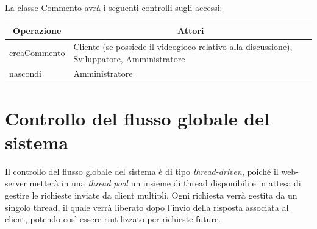 \newpage
La classe Commento avrà i seguenti controlli sugli accessi:
\begin{center}
	\begin{tabular}{||l | p{22em}||} 
	\hline
	\multicolumn{1}{||c|}{\textbf{Operazione}} & \multicolumn{1}{c||}{\textbf{Attori}} \\
	\hline\hline
	creaCommento & Cliente (se possiede il videogioco relativo alla discussione), Sviluppatore, Amministratore \\ 
	\hline
	nascondi & Amministratore \\
	\hline
   \end{tabular}
\end{center}

\newpage
\section{Controllo del flusso globale del sistema}
Il controllo del flusso globale del sistema è di tipo \emph{thread-driven}, poiché il web-server metterà in una \emph{thread pool} un insieme di thread disponibili e in attesa di gestire le richieste inviate da client multipli. Ogni richiesta verrà gestita da un singolo thread, il quale verrà liberato dopo l’invio della risposta associata al client, potendo così essere riutilizzato per richieste future.

